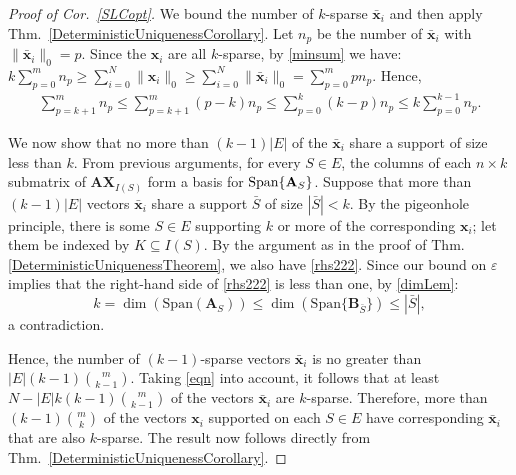 \documentclass[9pt,twocolumn]{pnas-new}
\begin{document}
 
 \begin{proof}[Proof of Cor.~\ref{SLCopt}]
We bound the number of $k$-sparse $\mathbf{\bar x}_i$ and then apply Thm.~\ref{DeterministicUniquenessCorollary}. 
Let $n_p$ be the number of $\mathbf{\bar x}_i$ with $\|\mathbf{\bar x}_i\|_0 = p$.  %
Since the $\mathbf{x}_i$ are all $k$-sparse, by \eqref{minsum} we have:
\mbox{$k \sum_{p = 0}^{m} n_p \geq \sum_{i=0}^N \|\mathbf{x}_i\|_0 \geq \sum_{i=0}^N \|\mathbf{\bar x}_i\|_0 = \sum_{p=0}^{m} p n_p.$}
Hence,
\begin{align}\label{eqn}
\sum_{p = k+1}^m n_p \leq \sum_{p = k+1}^m (p-k) n_p \leq \sum_{p = 0}^k (k-p)n_p \leq k \sum_{p = 0}^{k-1} n_p.
\end{align}

We now show that no more than $(k-1)|E|$ of the $\mathbf{\bar x}_i$ share a support of size less than $k$. 
From previous arguments, for every $S \in E$, the columns of each $n \times k$ submatrix of $\mathbf{AX}_{I(S)}$ form a basis for $\text{\rm Span}\{\mathbf{A}_S\}$.
Suppose that more than $(k-1)|E|$ vectors $\mathbf{\bar x}_i$ share a support $\bar S$ of size $|\bar{S}| < k$. By the pigeonhole principle, there is some $S \in E$ supporting $k$ or more of the corresponding $\mathbf{x}_i$; let them be indexed by $K \subseteq I(S)$.  By the argument as in the proof of Thm.\ref{DeterministicUniquenessTheorem}, we also have \eqref{rhs222}. Since our bound on $\varepsilon$ implies that the right-hand side of \eqref{rhs222} is less than one, by \eqref{dimLem}: \[k = \dim(\text{Span}(\mathbf{A}_S)) \leq \dim(\text{Span}\{\mathbf{B}_{\bar S}\}) \leq |\bar S|,\] a contradiction. 

Hence, the number of $(k-1)$-sparse vectors $\mathbf{\bar x}_i$ is no greater than $|E|(k-1){ m \choose k-1}$. Taking \eqref{eqn} into account, it follows that at least $N - |E|k(k-1){ m \choose k-1}$ of the vectors $\mathbf{\bar  x}_i$ are $k$-sparse. Therefore, more than $(k-1){m \choose k}$ of the vectors $\mathbf{x}_i$ supported on each $S \in E$ have corresponding $\mathbf{\bar x}_i$ that are also $k$-sparse. The result now follows directly from Thm.~\ref{DeterministicUniquenessCorollary}.
\end{proof}
\end{document}
